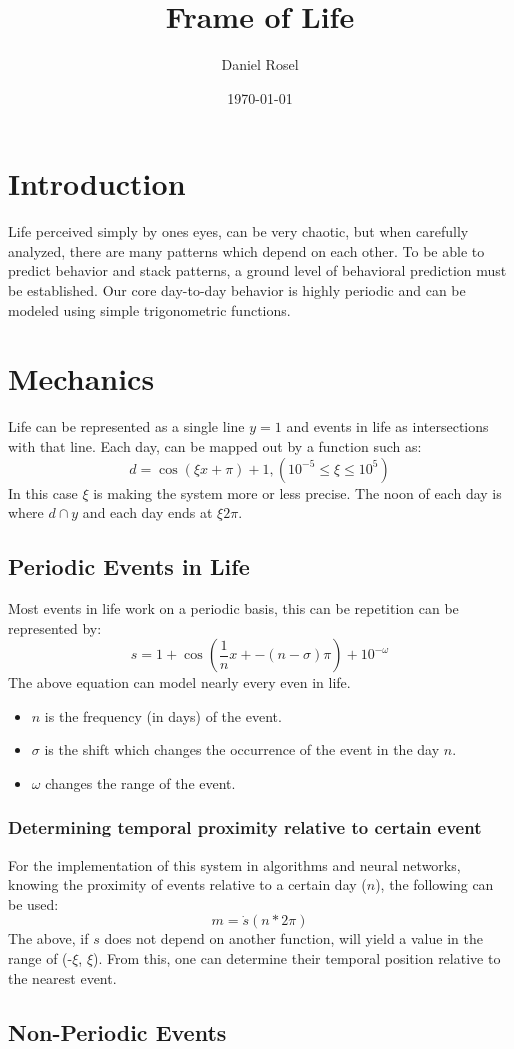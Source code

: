 \documentclass[11pt]{article}
\author{Daniel Rosel}
\date{\today}
\title{Frame of Life}
\begin{document}
\maketitle
\tableofcontents


\section{Introduction}
\label{sec:orgfeec809}
Life perceived simply by ones eyes, can be very chaotic, but when carefully analyzed, there are many patterns which depend on each other. To be able to predict behavior and stack patterns, a ground level of behavioral prediction must be established. Our core day-to-day behavior is highly periodic and can be modeled using simple trigonometric functions.
\section{Mechanics}
\label{sec:org9938656}
Life can be represented as a single line \(y = 1\) and events in life as intersections with that line. Each day, can be mapped out by a function such as:
\begin{equation}
    d = \cos{(\xi x + \pi) + 1}, (10^{-5} \leq \xi \leq 10^{5})
\end{equation}
In this case \(\xi\) is making the system more or less precise. The noon of each day is where \(d \cap y\) and each day ends at \(\xi2\pi\).
\subsection{Periodic Events in Life}
\label{sec:orgd4eaf90}
Most events in life work on a periodic basis, this can be repetition can be represented by:
\begin{equation}
s = 1 + \cos{(\frac{1}{n}x + -(n - \sigma)\pi) + 10^{-\omega}}
\end{equation}
The above equation can model nearly every even in life.
\begin{itemize}
\item \(n\) is the frequency (in days) of the event.
\item \(\sigma\) is the shift which changes the occurrence of the event in the day \(n\).
\item \(\omega\) changes the range of the event.
\end{itemize}
\subsubsection{Determining temporal proximity relative to certain event}
\label{sec:org08f02fe}
For the implementation of this system in algorithms and neural networks, knowing the proximity of events relative to a certain day (\(n\)), the following can be used:
\begin{equation}
    m = \dot{s}(n * 2\pi)
\end{equation}
The above, if \(s\) does not depend on another function, will yield a value in the range of (-\(\xi\), \(\xi\)). From this, one can determine their temporal position relative to the nearest event.

\subsection{Non-Periodic Events}
\label{sec:orgadca919}
\end{document}
